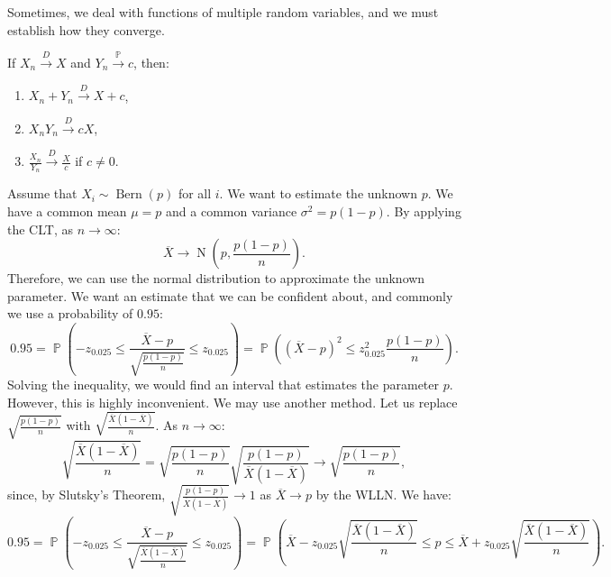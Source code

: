 \documentclass{huhtakm-template-book-v2}
\DeclareMathOperator{\prob}{\mathbb{P}}
\DeclareMathOperator{\Bern}{Bern}
\DeclareMathOperator{\N}{N}
\begin{document}
    Sometimes, we deal with functions of multiple random variables, and we must establish how they converge.
    \begin{thm}
        If $X_{n} \xrightarrow{D} X$ and $Y_{n} \xrightarrow{\prob} c$, then:
        \begin{enumerate}
            \item $X_{n} + Y_{n} \xrightarrow{D} X + c$,
            \item $X_{n} Y_{n} \xrightarrow{D} cX$,
            \item $\frac{X_{n}}{Y_{n}} \xrightarrow{D} \frac{X}{c}$ if $c \neq 0$.
        \end{enumerate}
    \end{thm}
    \newpage

    \begin{eg}
        Assume that $X_{i} \sim \Bern(p)$ for all $i$. We want to estimate the unknown $p$. We have a common mean $\mu = p$ and a common variance $\sigma^{2} = p(1 - p)$. By applying the CLT, as $n \to \infty$:
        \begin{equation*}
            \overline{X} \to \N\left(p, \frac{p(1 - p)}{n}\right).
        \end{equation*}
        Therefore, we can use the normal distribution to approximate the unknown parameter. We want an estimate that we can be confident about, and commonly we use a probability of $0.95$:
        \begin{equation*}
            0.95 = \prob\left(-z_{0.025} \leq \frac{\overline{X} - p}{\sqrt{\frac{p(1 - p)}{n}}} \leq z_{0.025}\right) = \prob\left((\overline{X} - p)^{2} \leq z_{0.025}^{2} \frac{p(1 - p)}{n}\right).
        \end{equation*} 
        Solving the inequality, we would find an interval that estimates the parameter $p$. However, this is highly inconvenient. We may use another method. Let us replace $\sqrt{\frac{p(1 - p)}{n}}$ with $\sqrt{\frac{\overline{X}(1 - \overline{X})}{n}}$. As $n \to \infty$:
        \begin{equation*}
            \sqrt{\frac{\overline{X}(1 - \overline{X})}{n}} = \sqrt{\frac{p(1 - p)}{n}} \sqrt{\frac{p(1 - p)}{\overline{X}(1 - \overline{X})}} \to \sqrt{\frac{p(1 - p)}{n}},
        \end{equation*}
        since, by Slutsky's Theorem, $\sqrt{\frac{p(1 - p)}{\overline{X}(1 - \overline{X})}} \to 1$ as $\overline{X} \to p$ by the WLLN. We have:
        \begin{equation*}
            0.95 = \prob\left(-z_{0.025} \leq \frac{\overline{X} - p}{\sqrt{\frac{\overline{X}(1 - \overline{X})}{n}}} \leq z_{0.025}\right) = \prob\left(\overline{X} - z_{0.025} \sqrt{\frac{\overline{X}(1 - \overline{X})}{n}} \leq p \leq \overline{X} + z_{0.025} \sqrt{\frac{\overline{X}(1 - \overline{X})}{n}}\right).
        \end{equation*} 
    \end{eg}
\end{document}
